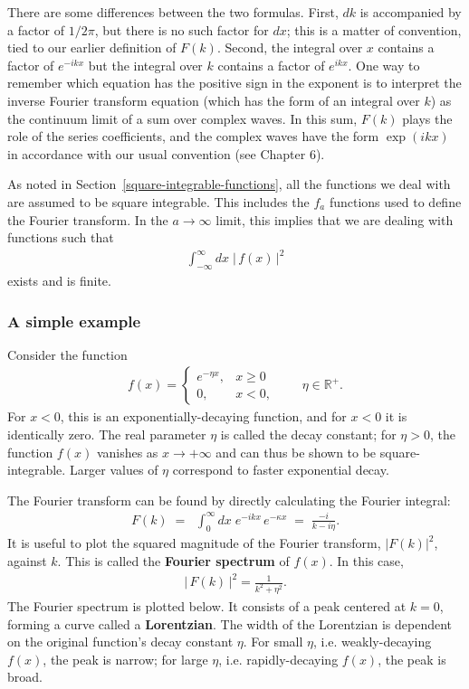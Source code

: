 \documentclass[10pt,a4paper]{article}
\begin{document}
There are some differences between the two formulas.  First, $dk$ is
accompanied by a factor of $1/2\pi$, but there is no such factor for
$dx$; this is a matter of convention, tied to our earlier definition
of $F(k)$.  Second, the integral over $x$ contains a factor of
$e^{-ikx}$ but the integral over $k$ contains a factor of
$e^{ikx}$. One way to remember which equation has the positive sign in
the exponent is to interpret the inverse Fourier transform equation
(which has the form of an integral over $k$) as the continuum limit of
a sum over complex waves. In this sum, $F(k)$ plays the role of the
series coefficients, and the complex waves have the form $\exp(ikx)$
in accordance with our usual convention (see Chapter 6).

As noted in Section~\ref{square-integrable-functions}, all the
functions we deal with are assumed to be square integrable. This
includes the $f_a$ functions used to define the Fourier transform. In
the $a \rightarrow \infty$ limit, this implies that we are dealing
with functions such that
\begin{align*}
  \int_{-\infty}^{\infty} dx\; \big|\,f(x)\,\big|^2
\end{align*}
exists and is finite.

\subsubsection{A simple example}
\label{simple-example}

Consider the function
\begin{align}
  f(x) = \left\{\begin{array}{cl}e^{-\eta x}, & x \ge 0 \\ 0, & x < 0,\end{array}\right. \qquad \eta \in \mathbb{R}^+.
\end{align}
For $x < 0$, this is an exponentially-decaying function, and for $x <
0$ it is identically zero. The real parameter $\eta$ is called the
decay constant; for $\eta > 0$, the function $f(x)$ vanishes as $x
\rightarrow +\infty$ and can thus be shown to be
square-integrable. Larger values of $\eta$ correspond to faster
exponential decay.

The Fourier transform can be found by directly calculating the Fourier
integral:
\begin{align}
  F(k) \;=\; \;\int_{0}^\infty dx\; e^{-i kx}\, e^{-\kappa x} \;=\; \frac{-i}{k - i \eta}.
\end{align}
It is useful to plot the squared magnitude of the Fourier transform,
$|F(k)|^2$, against $k$.  This is called the \textbf{Fourier spectrum}
of $f(x)$.  In this case,
\begin{align}
  \big|\,F(k)\,\big|^2 = \frac{1}{k^2 + \eta^2}.
\end{align}
The Fourier spectrum is plotted below.  It consists of a peak centered
at $k = 0$, forming a curve called a \textbf{Lorentzian}.  The width
of the Lorentzian is dependent on the original function's decay
constant $\eta$. For small $\eta$, i.e. weakly-decaying $f(x)$, the
peak is narrow; for large $\eta$, i.e. rapidly-decaying $f(x)$, the
peak is broad.
\end{document}
